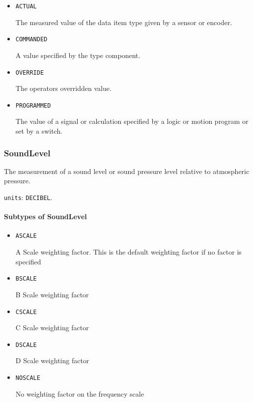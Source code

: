 \begin{itemize}

\item \texttt{ACTUAL}


The measured value of the data item type given by a sensor or encoder.

\item \texttt{COMMANDED}


A value specified by the  type component.

\item \texttt{OVERRIDE}


The operators overridden value.

\item \texttt{PROGRAMMED}


The value of a signal or calculation specified by a logic or motion program or set by a switch.


\end{itemize}







\subsubsection{SoundLevel}
\label{sec:SoundLevel}



The measurement of a sound level or sound pressure level relative to atmospheric pressure.


\texttt{units}: \texttt{DECIBEL}.

\paragraph{Subtypes of SoundLevel}\mbox{}
\label{sec:Subtypes of SoundLevel}

\begin{itemize}

\item \texttt{A\textunderscore SCALE}


A Scale weighting factor.   This is the default weighting factor if no factor is specified

\item \texttt{B\textunderscore SCALE}


B Scale weighting factor

\item \texttt{C\textunderscore SCALE}


C Scale weighting factor

\item \texttt{D\textunderscore SCALE}


D Scale weighting factor

\item \texttt{NO\textunderscore SCALE}


No weighting factor on the frequency scale


\end{itemize}








